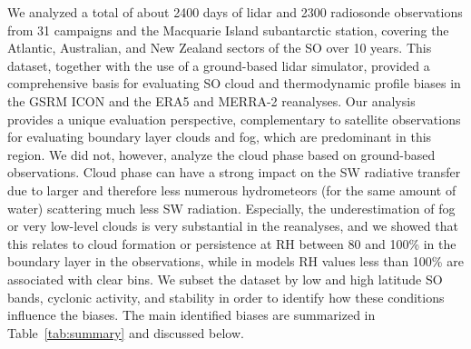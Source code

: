 \documentclass[draft]{agujournal2019}
\begin{document}
We analyzed a total of about 2400 days of lidar and 2300 radiosonde observations from 31 campaigns and the Macquarie Island subantarctic station, covering the Atlantic, Australian, and New Zealand sectors of the SO over 10 years. This dataset, together with the use of a ground-based lidar simulator, provided a comprehensive basis for evaluating SO cloud and thermodynamic profile biases in the GSRM ICON and the ERA5 and MERRA-2 reanalyses. Our analysis provides a unique evaluation perspective, complementary to satellite observations for evaluating boundary layer clouds and fog, which are predominant in this region. We did not, however, analyze the cloud phase based on ground-based observations. Cloud phase can have a strong impact on the SW radiative transfer due to larger and therefore less numerous hydrometeors (for the same amount of water) scattering much less SW radiation. Especially, the underestimation of fog or very low-level clouds is very substantial in the reanalyses, and we showed that this relates to cloud formation or persistence at RH between 80 and 100\% in the boundary layer in the observations, while in models RH values less than 100\% are associated with clear bins. We subset the dataset by low and high latitude SO bands, cyclonic activity, and stability in order to identify how these conditions influence the biases. The main identified biases are summarized in Table~\ref{tab:summary} and discussed below.
\end{document}
